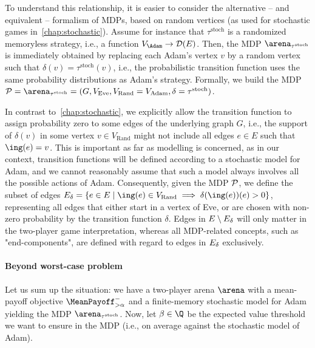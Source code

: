 To understand this relationship, it is easier to consider the alternative -- and equivalent -- formalism of MDPs, based on random vertices (as used for stochastic games in~\cref{chap:stochastic}). Assume for instance that $\tau^\text{stoch}$ is a randomized memoryless strategy, i.e., a function $V_{\Adam} \to \mathcal{D}(E)$. Then, the MDP $\arena_{\tau^\text{stoch}}$ is immediately obtained by replacing each Adam's vertex $v$ by a random vertex such that $\delta(v) = \tau^\text{stoch}(v)$, i.e., the probabilistic transition function uses the same probability distributions as Adam's strategy. Formally, we build the MDP $\mathcal{P} = \arena_{\tau^{\text{stoch}}} = (G, V_{\text{Eve}}, V_{\text{Rand}} = V_{\text{Adam}}, \delta = \tau^{\text{stoch}})$.

In contrast to~\cref{chap:stochastic}, we explicitly allow the transition function to assign probability zero to some edges of the underlying graph $G$, i.e., the support of $\delta(v)$ in some vertex $v \in V_{\text{Rand}}$ might not include all edges $e \in E$ such that $\ing(e) = v$.
This is important as far as modelling is concerned, as in our context, transition functions will be defined according to a stochastic model for Adam, and we cannot reasonably assume that such a model always involves all the possible actions of Adam. Consequently, given the MDP ${\mathcal{P}} $, we define the subset of edges $\edgesNonZero = \{ e \in E \mid \ing(e) \in V_{\text{Rand}} \implies \delta(\ing(e))(e) > 0\}$, representing all edges that either start in a vertex of Eve, or are chosen with non-zero probability by the transition function $\delta$. Edges in $E\setminus E_{\delta}$ will only matter in the two-player game interpretation, whereas all MDP-related concepts, such as "end-components", are defined with regard to edges in $E_{\delta}$ exclusively.

\paragraph{Beyond worst-case problem} Let us sum up the situation: we have a two-player arena $\arena$ with a mean-payoff objective $\MeanPayoff^{-}_{> \alpha}$ and a finite-memory stochastic model for Adam yielding the MDP $\arena_{\tau^\text{stoch}}$. Now, let $\beta \in \Q$ be the expected value threshold we want to ensure in the MDP (i.e., on average against the stochastic model of Adam).



